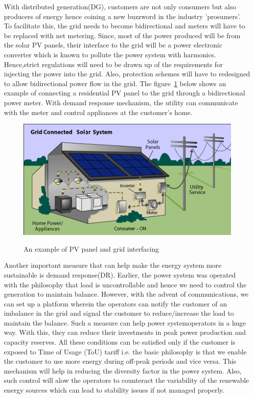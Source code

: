 \documentclass[11pt,a4paper]{article}
\begin{document}
With distributed generation(DG), customers are not only consumers but also producers of energy hence coining a new buzzword in the industry 'prosumers'. To facilitate this, the grid needs to become bidirectional and meters will have to be replaced with net metering. Since, most of the power produced will be from the solar PV panels, their interface to the grid will be a power electronic converter which is known to pollute the power system with harmonics. Hence,strict regulations will need to be drawn up of the requirements for injecting the power into the grid. Also, protection schemes will have to redesigned to allow bidirectional power flow in the grid. The figure~\ref{fig:pvgrid} below shows an example of connecting a residential PV panel to the grid through a bidirectional power meter. With demand response mechanism, the utility can communicate with the meter and control appliances at the customer's home.
\begin{figure}[h]
  \centering
  \includegraphics{gridpvtie.png}
  \label{fig:pvgrid}
  \caption{An example of PV panel and grid interfacing}
\end{figure}


Another important measure that can help make the energy system more sustainable is demand response(DR). Earlier, the power system was operated with the philosophy that load is uncontrollable and hence we need to control the generation to maintain balance. However, with the advent of communications, we can set up a platform wherein the operators can notify the customer of an imbalance in the grid and signal the customer to reduce/increase the load to maintain the balance. Such a measure can help power systemoperators in a huge way. With this, they can reduce their investments in peak power production and capacity reserves. All these conditions can be satisfied only if the customer is exposed to Time of Usage (ToU) tariff i.e. the basic philosophy is that we enable the customer to use more energy during off-peak periods and vice versa. This mechanism will help in reducing the diversity factor in the power system. Also, such control will alow the operators to counteract the variability of the renewable energy sources which can lead to stability issues if not managed properly.
\end{document}
